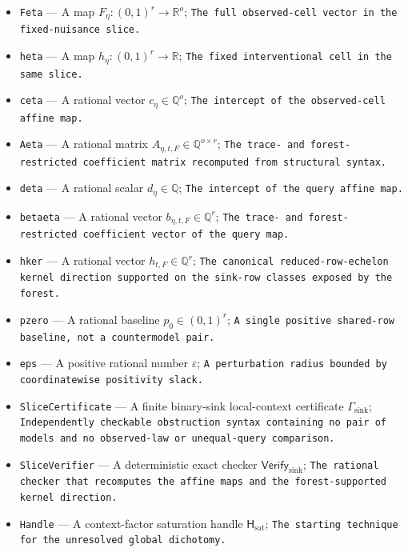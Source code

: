 \documentclass{article}
\begin{document}
\begin{itemize}
  \item \texttt{Feta} --- A map \(F_{\eta}:(0,1)^r\to\mathbb R^o\); \texttt{The full observed-\allowbreak{}cell vector in the fixed-\allowbreak{}nuisance slice.}
  \item \texttt{heta} --- A map \(h_{\eta}:(0,1)^r\to\mathbb R\); \texttt{The fixed interventional cell in the same slice.}
  \item \texttt{ceta} --- A rational vector \(c_{\eta}\in\mathbb Q^o\); \texttt{The intercept of the observed-\allowbreak{}cell affine map.}
  \item \texttt{Aeta} --- A rational matrix \(A_{\eta,t,F}\in\mathbb Q^{o\times r}\); \texttt{The trace-\allowbreak{} and forest-\allowbreak{}restricted coefficient matrix recomputed from structural syntax.}
  \item \texttt{deta} --- A rational scalar \(d_{\eta}\in\mathbb Q\); \texttt{The intercept of the query affine map.}
  \item \texttt{betaeta} --- A rational vector \(b_{\eta,t,F}\in\mathbb Q^r\); \texttt{The trace-\allowbreak{} and forest-\allowbreak{}restricted coefficient vector of the query map.}
  \item \texttt{hker} --- A rational vector \(h_{t,F}\in\mathbb Q^r\); \texttt{The canonical reduced-\allowbreak{}row-\allowbreak{}echelon kernel direction supported on the sink-\allowbreak{}row classes exposed by the forest.}
  \item \texttt{pzero} --- A rational baseline \(p_0\in(0,1)^r\); \texttt{A single positive shared-\allowbreak{}row baseline,\allowbreak{} not a countermodel pair.}
  \item \texttt{eps} --- A positive rational number \(\varepsilon\); \texttt{A perturbation radius bounded by coordinatewise positivity slack.}
  \item \texttt{SliceCertificate} --- A finite binary-sink local-context certificate \(\Gamma_{\mathrm{sink}}\); \texttt{Independently checkable obstruction syntax containing no pair of models and no observed-\allowbreak{}law or unequal-\allowbreak{}query comparison.}
  \item \texttt{SliceVerifier} --- A deterministic exact checker \(\mathsf{Verify}_{\mathrm{sink}}\); \texttt{The rational checker that recomputes the affine maps and the forest-\allowbreak{}supported kernel direction.}
  \item \texttt{Handle} --- A context-factor saturation handle \(\mathsf H_{\mathrm{sat}}\); \texttt{The starting technique for the unresolved global dichotomy.}

\end{itemize}
\end{document}
